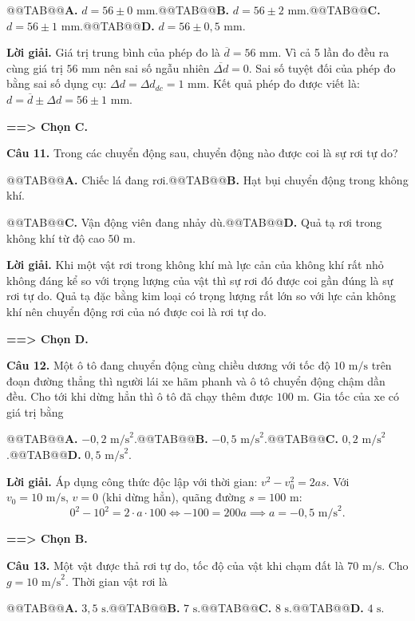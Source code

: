 \documentclass[11pt,a4paper]{article}
\begin{document}
@@TAB@@\textbf{A.} $d = 56 \pm 0\text{ mm}$.@@TAB@@\textbf{B.} $d = 56 \pm 2\text{ mm}$.@@TAB@@\textbf{C.} $d = 56 \pm 1\text{ mm}$.@@TAB@@\textbf{D.} $d = 56 \pm 0{,}5\text{ mm}$.

\textbf{Lời giải.} Giá trị trung bình của phép đo là $\overline{d} = 56\text{ mm}$. Vì cả 5 lần đo đều ra cùng giá trị $56\text{ mm}$ nên sai số ngẫu nhiên $\overline{\Delta d} = 0$. Sai số tuyệt đối của phép đo bằng sai số dụng cụ: $\Delta d = \Delta d_{dc} = 1\text{ mm}$.
Kết quả phép đo được viết là: $d = \overline{d} \pm \Delta d = 56 \pm 1\text{ mm}$.

\textbf{==> Chọn C.}

\textbf{Câu 11.} Trong các chuyển động sau, chuyển động nào được coi là sự rơi tự do?

@@TAB@@\textbf{A.} Chiếc lá đang rơi.@@TAB@@\textbf{B.} Hạt bụi chuyển động trong không khí.

@@TAB@@\textbf{C.} Vận động viên đang nhảy dù.@@TAB@@\textbf{D.} Quả tạ rơi trong không khí từ độ cao $50\text{ m}$.

\textbf{Lời giải.} Khi một vật rơi trong không khí mà lực cản của không khí rất nhỏ không đáng kể so với trọng lượng của vật thì sự rơi đó được coi gần đúng là sự rơi tự do. Quả tạ đặc bằng kim loại có trọng lượng rất lớn so với lực cản không khí nên chuyển động rơi của nó được coi là rơi tự do.

\textbf{==> Chọn D.}

\textbf{Câu 12.} Một ô tô đang chuyển động cùng chiều dương với tốc độ $10\text{ m/s}$ trên đoạn đường thẳng thì người lái xe hãm phanh và ô tô chuyển động chậm dần đều. Cho tới khi dừng hẳn thì ô tô đã chạy thêm được $100\text{ m}$. Gia tốc của xe có giá trị bằng

@@TAB@@\textbf{A.} $-0{,}2\text{ m/s}^2$.@@TAB@@\textbf{B.} $-0{,}5\text{ m/s}^2$.@@TAB@@\textbf{C.} $0{,}2\text{ m/s}^2$.@@TAB@@\textbf{D.} $0{,}5\text{ m/s}^2$.

\textbf{Lời giải.} Áp dụng công thức độc lập với thời gian: $v^2 - v_0^2 = 2as$.
Với $v_0 = 10\text{ m/s}$, $v = 0$ (khi dừng hẳn), quãng đường $s = 100\text{ m}$:
\[
0^2 - 10^2 = 2 \cdot a \cdot 100 \iff -100 = 200a \implies a = -0{,}5\text{ m/s}^2.
\]

\textbf{==> Chọn B.}

\textbf{Câu 13.} Một vật được thả rơi tự do, tốc độ của vật khi chạm đất là $70\text{ m/s}$. Cho $g = 10\text{ m/s}^2$. Thời gian vật rơi là

@@TAB@@\textbf{A.} $3{,}5\text{ s}$.@@TAB@@\textbf{B.} $7\text{ s}$.@@TAB@@\textbf{C.} $8\text{ s}$.@@TAB@@\textbf{D.} $4\text{ s}$.
\end{document}
